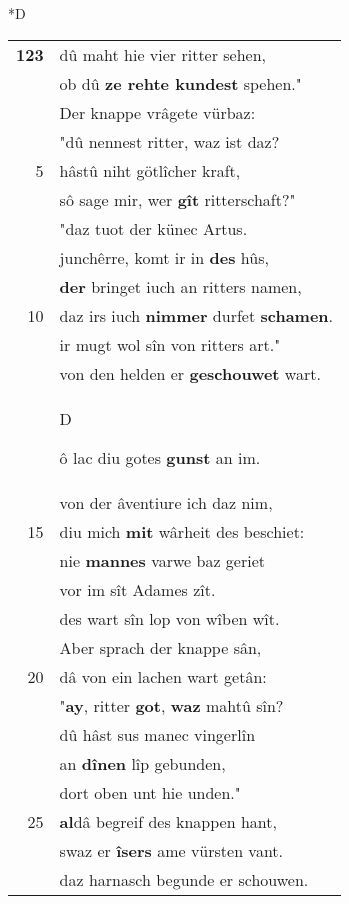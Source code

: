 \documentclass[8pt,a4paper,notitlepage]{article}
\begin{document}
\begin{table}[ht]
\begin{minipage}[t]{0.5\linewidth}
\small
\begin{center}*D
\end{center}
\begin{tabular}{rl}
\textbf{123} & dû maht hie vier ritter sehen,\\ 
 & ob dû \textbf{ze rehte kundest} spehen."\\ 
 & Der knappe vrâgete vürbaz:\\ 
 & "dû nennest ritter, waz ist daz?\\ 
5 & hâstû niht götlîcher kraft,\\ 
 & sô sage mir, wer \textbf{gît} ritterschaft?"\\ 
 & "daz tuot der künec Artus.\\ 
 & junchêrre, komt ir in \textbf{des} hûs,\\ 
 & \textbf{der} bringet iuch an ritters namen,\\ 
10 & daz irs iuch \textbf{nimmer} durfet \textbf{schamen}.\\ 
 & ir mugt wol sîn von ritters art."\\ 
 & von den helden er \textbf{geschouwet} wart.\\ 
 & \begin{large}D\end{large}ô lac diu gotes \textbf{gunst} an im.\\ 
 & von der âventiure ich daz nim,\\ 
15 & diu mich \textbf{mit} wârheit des beschiet:\\ 
 & nie \textbf{mannes} varwe baz geriet\\ 
 & vor im sît Adames zît.\\ 
 & des wart sîn lop von wîben wît.\\ 
 & Aber sprach der knappe sân,\\ 
20 & dâ von ein lachen wart getân:\\ 
 & "\textbf{ay}, ritter \textbf{got}, \textbf{waz} mahtû sîn?\\ 
 & dû hâst sus manec vingerlîn\\ 
 & an \textbf{dînen} lîp gebunden,\\ 
 & dort oben unt hie unden."\\ 
25 & \textbf{al}dâ begreif des knappen hant,\\ 
 & swaz er \textbf{îsers} ame vürsten vant.\\ 
 & daz harnasch begunde er schouwen.\\ 

\end{tabular}
\end{minipage}
\end{table}
\end{document}

